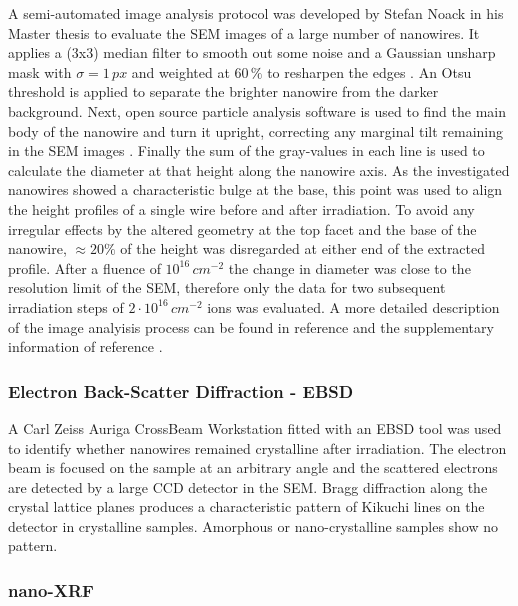 A semi-automated image analysis protocol was developed by Stefan Noack in his Master thesis \cite{noack_sputter_2014, johannes_anomalous_2015} to evaluate the SEM images of a large number of nanowires. It applies a (3x3) median filter to smooth out some noise and a Gaussian unsharp mask with $\sigma = 1\,px$ and weighted at $60\,\%$ to resharpen the edges \cite{sankur_survey_2004}. An Otsu threshold \cite{otsu_threshold_1979} is applied to separate the brighter nanowire from the darker background. Next, open source particle analysis software is used to find the main body of the nanowire and turn it upright, correcting any marginal tilt remaining in the SEM images \cite{schindelin_fiji:_2012,sage_imagej_2012}. Finally the sum of the gray-values in each line is used to calculate the diameter at that height along the nanowire axis. As the investigated nanowires showed a characteristic bulge at the base, this point was used to align the height profiles of a single wire before and after irradiation. To avoid any irregular effects by the altered geometry at the top facet and the base of the nanowire, $\approx 20\%$ of the height was disregarded at either end of the extracted profile. After a fluence of $10^{16}\,cm^{-2}$ the change in diameter was close to the resolution limit of the SEM, therefore only the data for two subsequent irradiation steps of $2\cdot 10^{16}\,cm^{-2}$ ions was evaluated. A more detailed description of the image analyisis process can be found in reference \cite{noack_sputter_2014} and the supplementary information of reference \cite{johannes_anomalous_2015}.

\subsubsection{Electron Back-Scatter Diffraction - EBSD}

A Carl Zeiss Auriga CrossBeam Workstation fitted with an EBSD tool was used to identify whether nanowires remained crystalline after irradiation. The electron beam is focused on the sample at an arbitrary angle and the scattered electrons are detected by a large CCD detector in the SEM. Bragg diffraction along the crystal lattice planes produces a characteristic pattern of Kikuchi lines on the detector \cite{kikuchi_diffraction_1928,fultz_transmission_2013} in crystalline samples. Amorphous or nano-crystalline samples show no pattern.

\subsubsection{nano-XRF}

